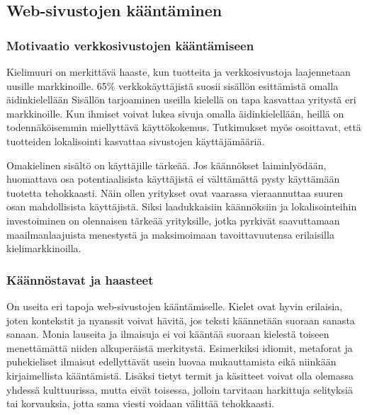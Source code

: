 \documentclass[11pt,a4paper,titlepage,oneside]{article}
\begin{document}
\newpage
\subsection{Web-sivustojen kääntäminen}






\subsubsection{Motivaatio verkkosivustojen kääntämiseen}



Kielimuuri on merkittävä haaste, kun tuotteita ja verkkosivustoja laajennetaan uusille markkinoille.
65\% verkkokäyttäjistä suosii sisällön esittämistä omalla äidinkielellään
Sisällön tarjoaminen useilla kielellä on tapa kasvattaa yritystä eri markkinoille. 
Kun ihmiset voivat lukea sivuja omalla äidinkielellään, heillä on todennäköisemmin miellyttävä käyttökokemus.
Tutkimukset myös osoittavat, että tuotteiden lokalisointi kasvattaa sivustojen käyttäjämääriä.
\medskip



Omakielinen sisältö on käyttäjille tärkeää.
Jos käännökset laiminlyödään, huomattava osa potentiaalisista käyttäjistä ei välttämättä pysty käyttämään tuotetta tehokkaasti.
Näin ollen yritykset ovat vaarassa vieraannuttaa suuren osan mahdollisista käyttäjistä.
Siksi laadukkaisiin käännöksiin ja lokalisointeihin investoiminen on olennaisen tärkeää yrityksille,
jotka pyrkivät saavuttamaan maailmanlaajuista menestystä ja maksimoimaan tavoittavuutensa erilaisilla kielimarkkinoilla.
\medskip 









\subsubsection{Käännöstavat ja haasteet}



On useita eri tapoja web-sivustojen kääntämiselle.
Kielet ovat hyvin erilaisia, joten kontekstit ja nyanssit voivat hävitä, jos teksti käännetään suoraan sanasta sanaan.
Monia lauseita ja ilmaisuja ei voi kääntää suoraan kielestä toiseen menettämättä niiden alkuperäistä merkitystä.
Esimerkiksi idiomit, metaforat ja puhekieliset ilmaisut edellyttävät usein luovaa mukauttamista eikä niinkään kirjaimellista kääntämistä. 
Lisäksi tietyt termit ja käsitteet voivat olla olemassa yhdessä kulttuurissa, 
mutta eivät toisessa, jolloin tarvitaan harkittuja selityksiä tai korvauksia, jotta sama viesti voidaan välittää tehokkaasti.
\medskip
\end{document}
